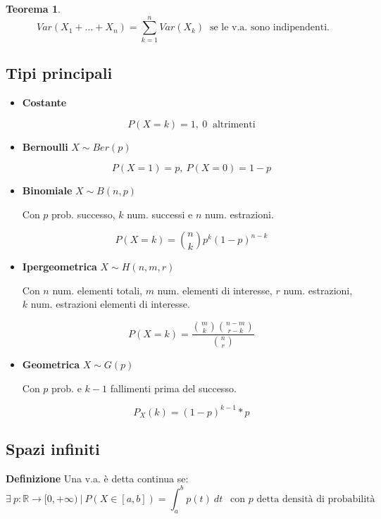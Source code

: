 \documentclass{article}
\newtheorem{theorem}{Teorema}
\begin{document}
\begin{theorem} $\ $\newline
    $$Var(X_1+\ldots+X_n)=\sum_{k=1}^nVar(X_k)\ \text{ se le v.a. sono indipendenti.}$$
\end{theorem}

\subsection{Tipi principali}
\begin{itemize}
    \item \textbf{Costante}

        $$P(X=k)=1,\ 0\ \text{ altrimenti}$$\newline

    \item \textbf{Bernoulli} $X\sim Ber(p)$

        $$P(X=1)=p,\ P(X=0)=1-p$$\newline

    \item \textbf{Binomiale} $X\sim B(n,p)$ 
    
    Con $p$ prob. successo, $k$ num. successi e $n$ num. estrazioni.

        $$P(X=k)=\binom{n}{k}p^k(1-p)^{n-k}$$\newline

    \item \textbf{Ipergeometrica} $X\sim H(n,m,r)$ 
    
    Con $n$ num. elementi totali, $m$ num. elementi di interesse, $r$ num. estrazioni, $k$ num. estrazioni elementi di interesse.

        $$P(X=k)=\frac{\binom{m}{k}\binom{n-m}{r-k}}{\binom{n}{r}}$$\newline

    \item \textbf{Geometrica} $X\sim G(p)$

    Con $p$ prob. e $k-1$ fallimenti prima del successo.

    $$P_X(k)=(1-p)^{k-1}*p$$\newline
    
\end{itemize}

\subsection{Spazi infiniti}

\textbf{Definizione} Una v.a. è detta continua se:
$$\exists\ p:\mathbb{R}\rightarrow[0,+\infty)\ |\ P(X\in[a,b])=\int_a^bp(t)\ dt\ \ \text{ con $p$ detta densità di probabilità}$$\newline
\end{document}

